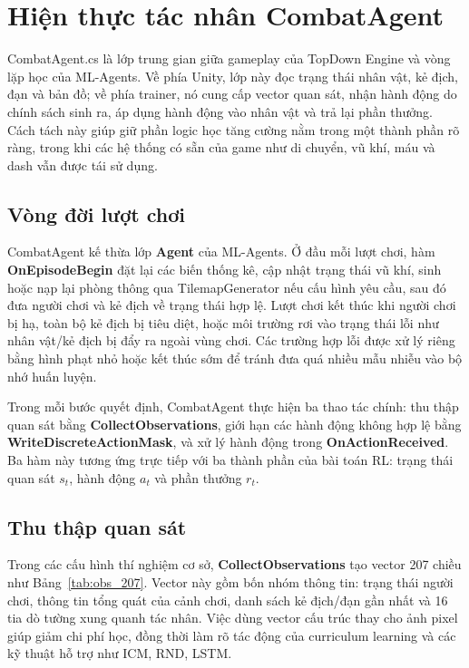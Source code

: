 \section{Hiện thực tác nhân CombatAgent}

CombatAgent.cs là lớp trung gian giữa gameplay của TopDown Engine và vòng lặp học của ML-Agents. Về phía Unity, lớp này đọc trạng thái nhân vật, kẻ địch, đạn và bản đồ; về phía trainer, nó cung cấp vector quan sát, nhận hành động do chính sách sinh ra, áp dụng hành động vào nhân vật và trả lại phần thưởng. Cách tách này giúp giữ phần logic học tăng cường nằm trong một thành phần rõ ràng, trong khi các hệ thống có sẵn của game như di chuyển, vũ khí, máu và dash vẫn được tái sử dụng.

\subsection{Vòng đời lượt chơi}

CombatAgent kế thừa lớp \textbf{Agent} của ML-Agents. Ở đầu mỗi lượt chơi, hàm \textbf{OnEpisodeBegin} đặt lại các biến thống kê, cập nhật trạng thái vũ khí, sinh hoặc nạp lại phòng thông qua TilemapGenerator nếu cấu hình yêu cầu, sau đó đưa người chơi và kẻ địch về trạng thái hợp lệ. Lượt chơi kết thúc khi người chơi bị hạ, toàn bộ kẻ địch bị tiêu diệt, hoặc môi trường rơi vào trạng thái lỗi như nhân vật/kẻ địch bị đẩy ra ngoài vùng chơi. Các trường hợp lỗi được xử lý riêng bằng hình phạt nhỏ hoặc kết thúc sớm để tránh đưa quá nhiều mẫu nhiễu vào bộ nhớ huấn luyện.

Trong mỗi bước quyết định, CombatAgent thực hiện ba thao tác chính: thu thập quan sát bằng \textbf{CollectObservations}, giới hạn các hành động không hợp lệ bằng \textbf{WriteDiscreteActionMask}, và xử lý hành động trong \textbf{OnActionReceived}. Ba hàm này tương ứng trực tiếp với ba thành phần của bài toán RL: trạng thái quan sát $s_t$, hành động $a_t$ và phần thưởng $r_t$.

\subsection{Thu thập quan sát}

Trong các cấu hình thí nghiệm cơ sở, \textbf{CollectObservations} tạo vector 207 chiều như Bảng~\ref{tab:obs_207}. Vector này gồm bốn nhóm thông tin: trạng thái người chơi, thông tin tổng quát của cảnh chơi, danh sách kẻ địch/đạn gần nhất và 16 tia dò tường xung quanh tác nhân. Việc dùng vector cấu trúc thay cho ảnh pixel giúp giảm chi phí học, đồng thời làm rõ tác động của curriculum learning và các kỹ thuật hỗ trợ như ICM, RND, LSTM.

